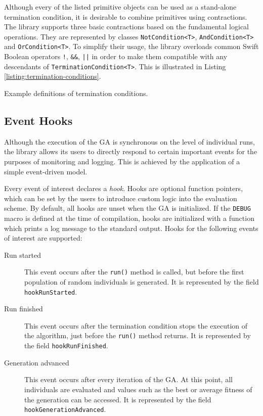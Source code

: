 Although every of the listed primitive objects can be used as a stand-alone termination condition, it is desirable to combine primitives using contractions. The library supports three basic contractions based on the fundamental logical operations. They are represented by classes \texttt{NotCondition<T>}, \texttt{AndCondition<T>} and \texttt{OrCondition<T>}. To simplify their usage, the library overloads common Swift Boolean operators \texttt{!}, \texttt{\&\&}, \texttt{||} in order to make them compatible with any descendants of \texttt{TerminationCondition<T>}. This is illustrated in Listing \ref{listing:termination-conditions}.

\begin{listing}[ht]
	\caption{Example definitions of termination conditions.}
	\label{listing:termination-conditions}
\end{listing}

\subsection{Event Hooks}
Although the execution of the GA is synchronous on the level of individual runs, the library allows its users to directly respond to certain important events for the purposes of monitoring and logging. This is achieved by the application of a simple event-driven model.

Every event of interest declares a \textit{hook}. Hooks are optional function pointers, which can be set by the users to introduce custom logic into the evaluation scheme. By default, all hooks are unset when the GA is initialized. If the \texttt{DEBUG} macro is defined at the time of compilation, hooks are initialized with a function which prints a log message to the standard output. Hooks  for the following events of interest are supported:
~
\begin{description}
	\item[Run started]
	This event occurs after the \texttt{run()} method is called, but before the first population of random individuals is generated. It is represented by the field \texttt{hookRunStarted}.

	\item[Run finished]
	This event occurs after the termination condition stops the execution of the algorithm, just before the \texttt{run()} method returns. It is represented by the field \texttt{hookRunFinished}.

	\item[Generation advanced]
	This event occurs after every iteration of the GA. At this point, all individuals are evaluated and values such as the best or average fitness of the generation can be accessed. It is represented by the field \texttt{hookGenerationAdvanced}.
\end{description}


